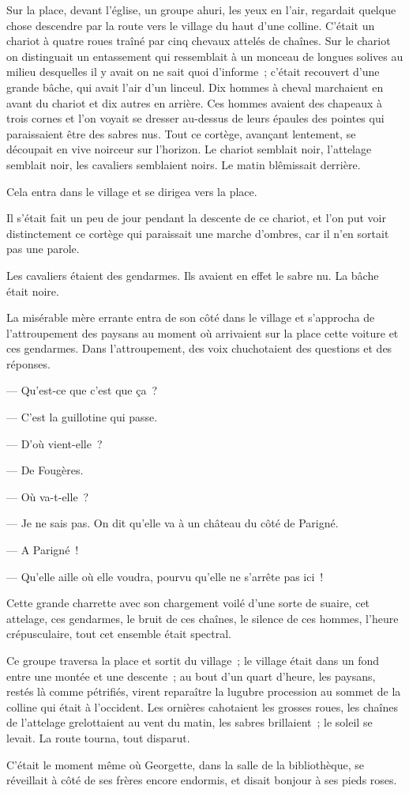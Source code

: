 \documentclass[french,twoside]{book} %
\begin{document}
Sur la place, devant l’église, un groupe ahuri, les yeux en l’air, regardait quelque chose descendre par la route vers le village du haut d’une colline. C’était un chariot à quatre roues traîné par cinq chevaux attelés de chaînes. Sur le chariot on distinguait un entassement qui ressemblait à un monceau de longues solives au milieu desquelles il y avait on ne sait quoi d’informe ; c’était recouvert d’une grande bâche, qui avait l’air d’un linceul. Dix hommes à cheval marchaient en avant du chariot et dix autres en arrière. Ces hommes avaient des chapeaux à trois cornes et l’on voyait se dresser au-dessus de leurs épaules des pointes qui paraissaient être des sabres nus. Tout ce cortège, avançant lentement, se découpait en vive noirceur sur l’horizon. Le chariot semblait noir, l’attelage semblait noir, les cavaliers semblaient noirs. Le matin blêmissait derrière.\par
Cela entra dans le village et se dirigea vers la place.\par
Il s’était fait un peu de jour pendant la descente de ce chariot, et l’on put voir distinctement ce cortège qui paraissait une marche d’ombres, car il n’en sortait pas une parole.\par
Les cavaliers étaient des gendarmes. Ils avaient en effet le sabre nu. La bâche était noire.\par
La misérable mère errante entra de son côté dans le village et s’approcha de l’attroupement des paysans au moment où arrivaient sur la place cette voiture et ces gendarmes. Dans l’attroupement, des voix chuchotaient des questions et des réponses.\par
 — Qu’est-ce que c’est que ça ?\par
— C’est la guillotine qui passe.\par
— D’où vient-elle ?\par
— De Fougères.\par
— Où va-t-elle ?\par
— Je ne sais pas. On dit qu’elle va à un château du côté de Parigné.\par
— A Parigné !\par
— Qu’elle aille où elle voudra, pourvu qu’elle ne s’arrête pas ici !\par
Cette grande charrette avec son chargement voilé d’une sorte de suaire, cet attelage, ces gendarmes, le bruit de ces chaînes, le silence de ces hommes, l’heure crépusculaire, tout cet ensemble était spectral.\par
Ce groupe traversa la place et sortit du village ; le village était dans un fond entre une montée et une descente ; au bout d’un quart d’heure, les paysans, restés là comme pétrifiés, virent reparaître la lugubre procession au sommet de la colline qui était à l’occident. Les ornières cahotaient les grosses roues, les chaînes de l’attelage grelottaient au vent du matin, les sabres brillaient ; le soleil se levait. La route tourna, tout disparut.\par
C’était le moment même où Georgette, dans la salle de la bibliothèque, se réveillait à côté de ses frères encore endormis, et disait bonjour à ses pieds roses.
\end{document}
